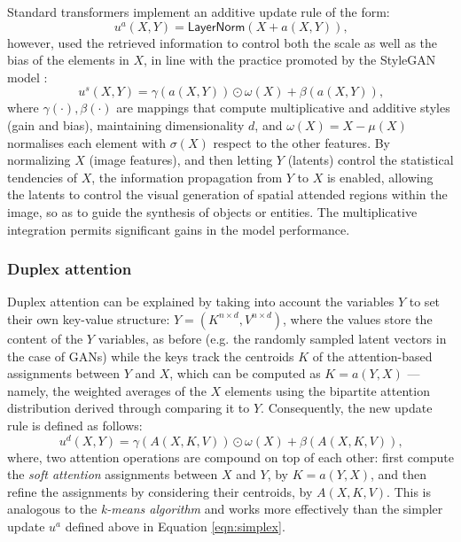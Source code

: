 \documentclass{article}
\begin{document}
	Standard transformers implement an additive update rule of the form:
	\begin{equation}
		\label{eqn:layernorm}
		u^a(X, Y)=\mathsf{LayerNorm}(X + a(X, Y)) \mbox{,}
	\end{equation}
	however, \cite{hudson2021generative} used the retrieved information to control both the scale as 
	well as the bias of the elements in $X$, in line with the practice promoted by the StyleGAN model 
	\cite{karras2019style}:
	\begin{equation}
		\label{eqn:simplex}
		u^s(X, Y)=\gamma (a(X, Y)) \odot \omega (X) + \beta (a(X, Y)) \mbox{,}
	\end{equation}
	where $\gamma(\cdot), \beta(\cdot)$ are mappings that compute multiplicative and additive styles 
	(gain and bias), maintaining dimensionality $d$, and $\omega (X) = X- \mu(X)$ normalises each 
	element with $\sigma(X)$ respect to the other features. By normalizing $X$ (image features), and 
	then letting $Y$ (latents) control the statistical tendencies of $X$, the information propagation from 
	$Y$ to $X$ is enabled, allowing the latents to control the visual generation of spatial attended 
	regions within the image, so as to guide the synthesis of objects or entities.
	The multiplicative integration permits significant gains in the model performance. 
	
	\subsubsection{Duplex attention}%
	Duplex attention can be explained by taking into account the variables $Y$ to set their own 
	key-value structure: $Y = (K^{n\times d} , V^{n\times d})$, where the values store the content of the 
	$Y$ variables, as before (e.g. the randomly sampled latent vectors in the case of GANs) while the 
	keys track the centroids $K$ of the attention-based assignments between $Y$ and $X$, which can 
	be computed as $K = a(Y, X)$ — namely, the weighted averages of the $X$ elements using the 
	bipartite attention distribution derived through comparing it to $Y$. 
	Consequently, the new update rule is defined as follows:
	\begin{equation}
		\label{eqn:duplex}
		u^d(X, Y )=\gamma (A(X, K, V)) \odot \omega (X) + \beta (A(X, K, V)) \mbox{,}
	\end{equation}
	where, two attention operations are compound on top of each other: first compute the \textit{soft 
	attention} assignments between $X$ and $Y$, by $K = a(Y, X)$, and then refine the assignments by 
	considering their centroids, by $A(X, K, V)$. This is analogous to the \textit{k-means algorithm} and 
	works more effectively than the simpler update $u^a$ defined above in Equation \eqref{eqn:simplex}.
	
\end{document}
